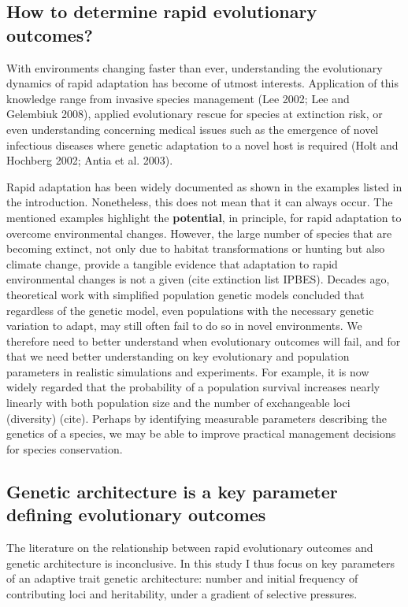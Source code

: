 \documentclass{article}
\begin{document}
\subsection{How to determine rapid evolutionary outcomes?}

With environments changing faster than ever, understanding the evolutionary dynamics of rapid adaptation has become of utmost interests. Application of this knowledge range from  invasive species management (Lee 2002; Lee and Gelembiuk 2008), applied evolutionary rescue for species at extinction risk, or even understanding  concerning medical issues such as the emergence of novel infectious diseases where genetic adaptation to a novel host is required (Holt and Hochberg 2002; Antia et al. 2003).

Rapid adaptation has been widely documented as shown in the examples listed in the introduction. Nonetheless, this does not mean that it can always occur. The mentioned examples highlight the \textbf{potential}, in principle, for rapid adaptation to overcome environmental changes. However, the large number of species that are becoming extinct, not only due to habitat transformations or hunting but also climate change, provide a tangible evidence that adaptation to rapid environmental changes is not a given (cite extinction list IPBES). Decades ago, theoretical work with simplified population genetic models \citep{Gomulkiewicz1995-sj} concluded that regardless of the genetic model, even populations with the necessary genetic variation to adapt, may still often fail to do so in novel environments. We therefore need to better understand when evolutionary outcomes will fail, and for that we need better understanding on key evolutionary and population parameters in realistic simulations and experiments. For example, it is now widely regarded that the  probability  of  a population  survival  increases  nearly  linearly  with  both  population  size  and  the number of exchangeable loci (diversity) (cite). Perhaps by identifying measurable parameters describing the genetics of a species, we may be able to improve practical management decisions for species conservation. 

\subsection{Genetic architecture is a key parameter defining evolutionary outcomes}

The literature on the relationship between rapid evolutionary outcomes and genetic architecture is inconclusive. In this study I thus focus on key parameters of an adaptive trait genetic architecture: number and initial frequency of contributing loci and heritability, under a gradient of selective pressures. 
\end{document}
